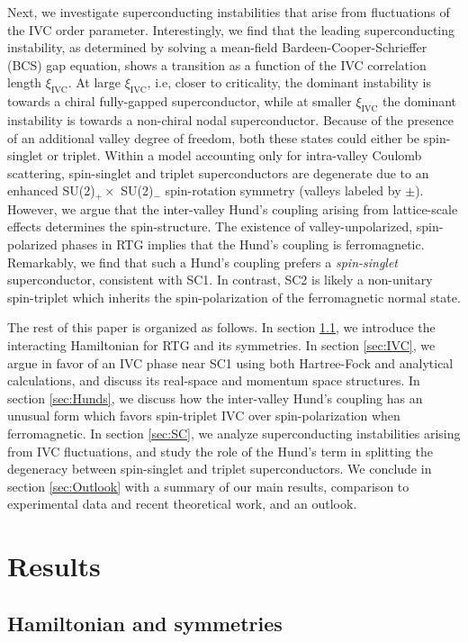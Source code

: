 \documentclass[aps,pra,twocolumn,superscriptaddress,10pt,article,nofootinbib,showpacs,longbibliography]{revtex4-1}
\begin{document}
Next, we investigate superconducting instabilities that arise from fluctuations of the IVC order parameter.
Interestingly, we find that the leading superconducting instability, as determined by solving a mean-field Bardeen-Cooper-Schrieffer (BCS) gap equation, shows a transition as a function of the IVC correlation length $\xi_{\textrm{IVC}}$. 
At large $\xi_{\textrm{IVC}}$, i.e, closer to criticality, the dominant instability is towards a chiral fully-gapped superconductor, while at smaller $\xi_{\textrm{IVC}}$ the dominant instability is towards a non-chiral nodal superconductor. 
Because of the presence of an additional valley degree of freedom, both these states could either be spin-singlet or triplet.
Within a model accounting only for intra-valley Coulomb scattering, spin-singlet and triplet superconductors are degenerate due to an enhanced SU(2)$_+ \times$ SU(2)$_-$ spin-rotation symmetry (valleys labeled by $\pm$). However, we argue that the inter-valley Hund's coupling arising from lattice-scale effects determines the spin-structure. 
The existence of  valley-unpolarized, spin-polarized phases in RTG implies that the Hund's coupling is ferromagnetic. 
Remarkably, we find that such a Hund's coupling prefers a \textit{spin-singlet} superconductor, consistent with SC1.
In contrast, SC2 is likely a non-unitary spin-triplet which inherits the spin-polarization of the ferromagnetic normal state. 

The rest of this paper is organized as follows.
In section \ref{sec:Model}, we introduce the interacting Hamiltonian for RTG and its symmetries.
In section \ref{sec:IVC}, we argue in favor of an IVC phase near SC1 using both Hartree-Fock and analytical calculations, and discuss its real-space and momentum space structures.
In section \ref{sec:Hunds}, we discuss how the inter-valley Hund's coupling has an unusual form which favors spin-triplet IVC over spin-polarization when ferromagnetic.
In section \ref{sec:SC}, we analyze superconducting instabilities arising from IVC fluctuations, and study the role of the Hund's term in splitting the degeneracy between spin-singlet and triplet superconductors.
We conclude in section \ref{sec:Outlook} with a summary of our main results, comparison to experimental data and recent theoretical work, and an outlook.

\section{Results}
\subsection{Hamiltonian and symmetries}
\label{sec:Model}
\end{document}
